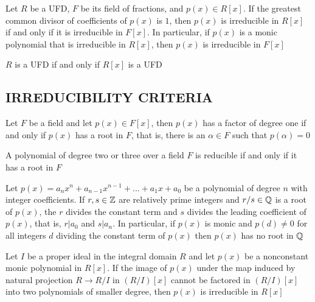 \begin{corollary}
	Let $R$ be a UFD, $F$ be its field of fractions, and $p(x) \in R[x]$. If the greatest common divisor of coefficients of $p(x)$ is $1$, then $p(x)$ is irreducible in $R[x]$ if and only if it is irreducible in $F[x]$. In particular, if $p(x)$ is a monic polynomial that is irreducible in $R[x]$, then $p(x)$ is irreducible in $F[x]$
\end{corollary}

\begin{theorem}
	$R$ is a UFD if and only if $R[x]$ is a UFD
\end{theorem}

\subsection{IRREDUCIBILITY CRITERIA}
 
 \begin{proposition}
	Let $F$ be a field and let $p(x) \in F[x]$, then $p(x)$ has a factor of degree one if and only if $p(x)$ has a root in $F$, that is, there is an $\alpha \in F$ such that $p(\alpha) = 0$ 
 \end{proposition}
 
 \begin{proposition}
	A polynomial of degree two or three over a field $F$ is reducible if and only if it has a root in $F$
 \end{proposition}
 
 \begin{proposition}
	Let $p(x) = a_n x^n + a_{n-1} x^{n-1} + ... + a_1 x + a_0$ be a polynomial of degree $n$ with integer coefficients. If $r, s \in \mathbb{Z}$ are relatively prime integers and $r / s \in \mathbb{Q}$ is a root of $p(x)$, the $r$ divides the constant term and $s$ divides the leading coefficient of $p(x)$, that is, $r | a_0$ and $s | a_n$. In particular, if $p(x)$ is monic and $p(d) \neq 0$ for all integers $d$ dividing the constant term of $p(x)$ then $p(x)$ has no root in $\mathbb{Q}$ 
	
 \end{proposition}
 
 \begin{proposition}
	Let $I$ be a proper ideal in the integral domain $R$ and let $p(x)$ be a nonconstant monic polynomial in $R[x]$. If the image of $p(x)$ under the map induced by natural projection $R \to R/I$ in $(R/I)[x]$ cannot be factored in $(R/I)[x]$ into two polynomials of smaller degree, then $p(x)$ is irreducible in $R[x]$
	
 \end{proposition}
 
